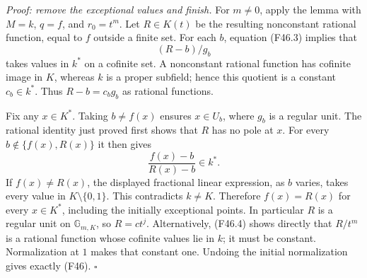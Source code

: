 \emph{Proof: remove the exceptional values and finish.}
For $m\ne0$, apply the lemma with $M=k$, $q=f$, and $r_0=t^m$.
Let $R\in K(t)$ be the resulting nonconstant rational function,
equal to $f$ outside a finite set. For each $b$, equation (F46.3)
implies that
\[
 (R-b)/g_b
\]
takes values in $k^*$ on a cofinite set. A nonconstant rational
function has cofinite image in $K$, whereas $k$ is a proper
subfield; hence this quotient is a constant $c_b\in k^*$.
Thus $R-b=c_b g_b$ as rational functions.

Fix any $x\in K^*$. Taking $b\ne f(x)$ ensures $x\in U_b$,
where $g_b$ is a regular unit. The rational identity just proved
first shows that $R$ has no pole at $x$. For every
$b\notin\{f(x),R(x)\}$ it then gives
\[
 \frac{f(x)-b}{R(x)-b}\in k^*.
\]
If $f(x)\ne R(x)$, the displayed fractional linear expression,
as $b$ varies, takes every value in $K\setminus\{0,1\}$.
This contradicts $k\ne K$. Therefore $f(x)=R(x)$ for every
$x\in K^*$, including the initially exceptional points.
In particular $R$ is a regular unit on $\mathbb G_{m,K}$, so
$R=c t^j$. Alternatively, (F46.4) shows directly that
$R/t^m$ is a rational function whose cofinite values lie in $k$;
it must be constant. Normalization at $1$ makes that constant one.
Undoing the initial normalization gives exactly (F46).
\hfill$\square$
